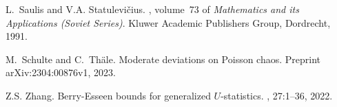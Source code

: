 \documentclass[12pt]{article}
\numberwithin{equation}{section}
\begin{document}
\begin{thebibliography}{BRSW17}
L.~Saulis and V.A. Statulevi\v{c}ius.
, volume~73 of {\em
  Mathematics and its Applications (Soviet Series)}.
\newblock Kluwer Academic Publishers Group, Dordrecht, 1991.

M.~Schulte and C.~Th{\"a}le.
\newblock Moderate deviations on {P}oisson chaos.
\newblock Preprint arXiv:2304:00876v1, 2023.

Z.S. Zhang.
\newblock Berry-{E}sseen bounds for generalized {$U$}-statistics.
, 27:1--36, 2022.

\end{thebibliography}
\end{document}
